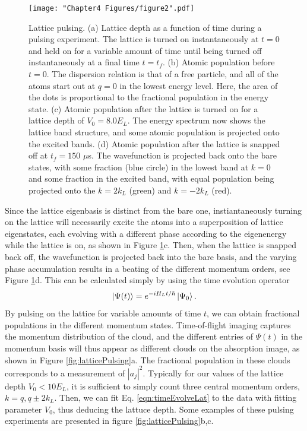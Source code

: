 \begin{figure}
\texttt{[image: "Chapter4 Figures/figure2".pdf]}
\caption[Lattice pulsing]{Lattice pulsing. (a) Lattice depth as a function of time during a pulsing experiment. The lattice is turned on instantaneously at $t=0$ and held on for a variable amount of time until being turned off instantaneously at a final time $t=t_f$. (b) Atomic population before $t=0$. The dispersion relation is that of a free particle, and all of the atoms start out at $q=0$ in the lowest energy level. Here, the area of the dots is proportional to the fractional population in the energy state. (c) Atomic population after the lattice is turned on for a lattice depth of $V_0 = 8.0 E_L$. The energy spectrum now shows the lattice band structure, and some atomic population is projected onto the excited bands. (d) Atomic population after the lattice is snapped off at $t_f = 150$ $\mu$s. The wavefunction is projected back onto the bare states, with some fraction (blue circle) in the lowest band at $k=0$ and some fraction in the excited band, with equal population being projected onto the $k = 2 k_L$ (green) and $k=-2k_L$ (red). }
\label{fig:pulsingSchematic}
\end{figure}
Since the lattice eigenbasis is distinct from the bare one, instiantaneously turning on the lattice will necessarily excite the atoms into a superposition of lattice eigenstates, each evolving with a different phase according to the eigenenergy while the lattice is on, as shown in  Figure \ref{fig:pulsingSchematic}c. Then, when the lattice is snapped back off, the wavefunction is projected back into the bare basis, and the varying phase accumulation results in a beating of the different momentum orders, see  Figure \ref{fig:pulsingSchematic}d. This can be calculated simply by using the time evolution operator
\begin{equation}
\mathinner{|{\Psi(t)}\rangle} = e^{-i H_L t/\hbar}\mathinner{|{\Psi_0}\rangle}.
\label{eqn:timeEvolveLat}
\end{equation}
By pulsing on the lattice for variable amounts of time $t$, we can obtain fractional populations in the different momentum states. Time-of-flight imaging captures the momentum distribution of the cloud, and the different entries of $\Psi(t)$ in the momentum basis will thus appear as different clouds on the absorption image, as shown in Figure \ref{fig:latticePulsing}a. The fractional population in these clouds corresponds to a measurement of $|a_j|^2$.  Typically for our values of the lattice depth $V_0 < 10 E_L$, it is sufficient to simply count three central momentum orders, $k = q, q \pm 2 k_L$. Then, we can fit Eq. \ref{eqn:timeEvolveLat} to the data with fitting parameter $V_0$, thus deducing the lattuce depth. Some examples of these pulsing experiments are presented in figure \ref{fig:latticePulsing}b,c.
